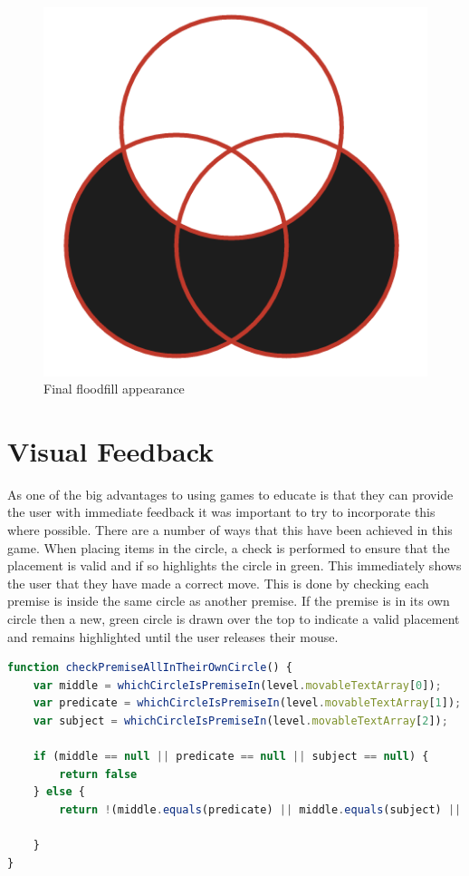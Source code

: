 \documentclass[12pt,a4paper]{report}
\begin{document}
	\begin{figure}[h]
\centering
    \includegraphics[scale=0.4]{floodFillGood}
    \caption{Final floodfill appearance}
    \label{fig:floodFillGood}
\end{figure}
\FloatBarrier
	
	\section{Visual Feedback}
As one of the big advantages to using games to educate is that they can provide the user with immediate feedback it was important to try to incorporate this where possible. There are a number of ways that this have been achieved in this game. When placing items in the circle, a check is performed to ensure that the placement is valid and if so highlights the circle in green. This immediately shows the user that they have made a correct move.  This is done by checking each premise is inside the same circle as another premise. If the premise is in its own circle then a new, green circle is drawn over the top to indicate a valid placement and remains highlighted until the user releases their mouse.

\begin{minipage}{\linewidth}
\begin{lstlisting}[language=JavaScript]
function checkPremiseAllInTheirOwnCircle() {
    var middle = whichCircleIsPremiseIn(level.movableTextArray[0]);
    var predicate = whichCircleIsPremiseIn(level.movableTextArray[1]);
    var subject = whichCircleIsPremiseIn(level.movableTextArray[2]);

    if (middle == null || predicate == null || subject == null) {
        return false
    } else {
        return !(middle.equals(predicate) || middle.equals(subject) || predicate.equals(subject));

    }
}
\end{lstlisting}
\end{minipage}
\end{document}
